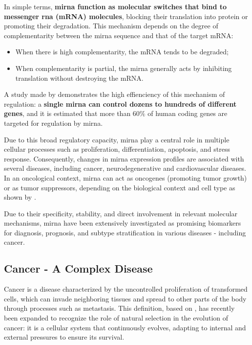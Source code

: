 In simple terms, \textbf{\gls{mirna} function as molecular switches that bind
  to messenger \gls{rna} (mRNA) molecules}, blocking their translation into
protein or promoting their degradation. This mechanism depends on the degree of
complementarity between the \gls{mirna} sequence and that of the target mRNA:

\begin{itemize}
  \item When there is high complementarity, the mRNA tends to be degraded;
  \item When complementarity is partial, the \gls{mirna} generally acts by inhibiting
        translation without destroying the mRNA.
\end{itemize}

A study made by \textcite{role_mirna_Calaf2023} demonstrates the high
effienciency of this mechanism of regulation: a \textbf{single \gls{mirna} can
  control dozens to hundreds of different genes}, and it is estimated that more
than $60\%$ of human coding genes are targeted for regulation by \gls{mirna}.

Due to this broad regulatory capacity, \gls{mirna} play a central role in
multiple cellular processes such as proliferation, differentiation, apoptosis,
and stress response. Consequently, changes in \gls{mirna} expression profiles
are associated with several diseases, including cancer, neurodegenerative and
cardiovascular diseases. In an oncological context, \gls{mirna} can act as
oncogenes (promoting tumor growth) or as tumor suppressors, depending on the
biological context and cell type as shown by
\textcite{regulatory_mecha_mirnaGulyaeva2016}.

Due to their specificity, stability, and direct involvement in relevant
molecular mechanisms, \gls{mirna} have been extensively investigated as
promising biomarkers for diagnosis, prognosis, and subtype stratification in
various diseases - including cancer.

\subsection{Cancer - A Complex Disease}
Cancer is a disease characterized by the uncontrolled proliferation of
transformed cells, which can invade neighboring tissues and spread to other
parts of the body through processes such as metastasis. This definition, based
on \textcite{NCI2021,def_of_cancer_Brown2023}, has recently been expanded to
recognize the role of natural selection in the evolution of cancer: it is a
cellular system that continuously evolves, adapting to internal and external
pressures to ensure its survival.

